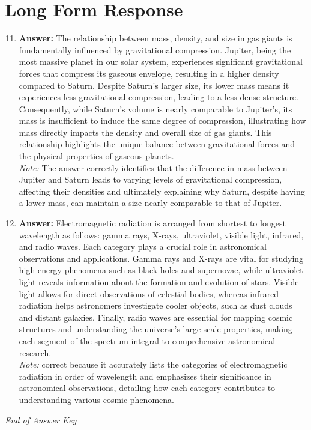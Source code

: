 \documentclass[12pt]{article}
\begin{document}
\section*{Long Form Response}
\begin{enumerate}[label=\arabic*.]
\setcounter{enumi}{10}
\item \textbf{Answer:} The relationship between mass, density, and size in gas giants is fundamentally influenced by gravitational compression. Jupiter, being the most massive planet in our solar system, experiences significant gravitational forces that compress its gaseous envelope, resulting in a higher density compared to Saturn. Despite Saturn's larger size, its lower mass means it experiences less gravitational compression, leading to a less dense structure. Consequently, while Saturn's volume is nearly comparable to Jupiter's, its mass is insufficient to induce the same degree of compression, illustrating how mass directly impacts the density and overall size of gas giants. This relationship highlights the unique balance between gravitational forces and the physical properties of gaseous planets.
\\ \textit{Note:} The answer correctly identifies that the difference in mass between Jupiter and Saturn leads to varying levels of gravitational compression, affecting their densities and ultimately explaining why Saturn, despite having a lower mass, can maintain a size nearly comparable to that of Jupiter.
\item \textbf{Answer:} Electromagnetic radiation is arranged from shortest to longest wavelength as follows: gamma rays, X-rays, ultraviolet, visible light, infrared, and radio waves. Each category plays a crucial role in astronomical observations and applications. Gamma rays and X-rays are vital for studying high-energy phenomena such as black holes and supernovae, while ultraviolet light reveals information about the formation and evolution of stars. Visible light allows for direct observations of celestial bodies, whereas infrared radiation helps astronomers investigate cooler objects, such as dust clouds and distant galaxies. Finally, radio waves are essential for mapping cosmic structures and understanding the universe's large-scale properties, making each segment of the spectrum integral to comprehensive astronomical research.
\\ \textit{Note:} correct because it accurately lists the categories of electromagnetic radiation in order of wavelength and emphasizes their significance in astronomical observations, detailing how each category contributes to understanding various cosmic phenomena.
\end{enumerate}

\vfill
\noindent\textit{End of Answer Key}
\end{document}
